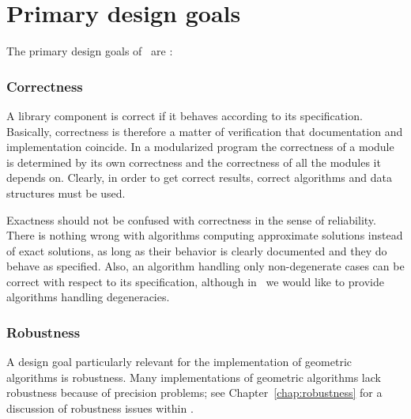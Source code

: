 
\section{Primary design goals}
\label{sec:design_goals}
The primary design goals of \cgal\ are \cite{Fabri98}:

\subsubsection*{Correctness}
A library component is correct if it behaves according to its
specification. 
Basically, correctness is therefore a matter of 
verification that documentation and implementation coincide.
In a modularized program the correctness of a module is determined 
by its own correctness and the correctness of all the modules it depends on.  
Clearly, in order to get correct results, correct algorithms and data 
structures must be used. 

Exactness should not be confused with correctness in the sense of
reliability. There is nothing wrong with algorithms computing approximate 
solutions instead of exact solutions, as long as their 
behavior is clearly documented and they do behave as specified.
Also, an algorithm handling only non-degenerate cases can be
correct with respect to its specification, although in \cgal\ we would
like to provide algorithms handling degeneracies. 

\subsubsection*{Robustness}
A design goal particularly relevant for the implementation of
geometric algorithms is robustness.  Many implementations of geometric
algorithms lack robustness because of precision problems; see 
Chapter~\ref{chap:robustness} for a discussion of robustness issues within 
\cgal.

